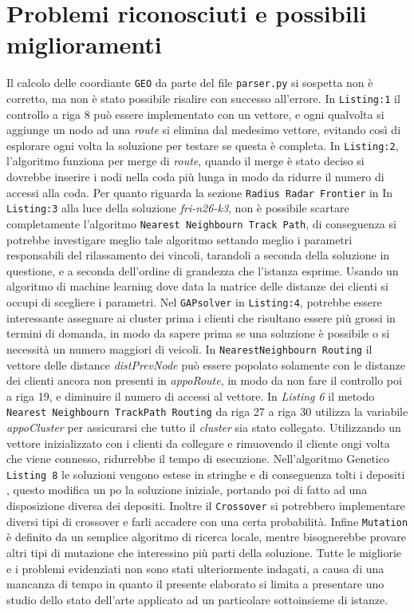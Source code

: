 \documentclass[]{article}
\begin{document}
\section{Problemi riconosciuti e possibili miglioramenti}
Il calcolo delle coordiante \texttt{GEO} da parte del file \texttt{parser.py} si sospetta non è corretto, ma non è stato possibile risalire con successo all'errore.
In \texttt{Listing:1} il controllo a riga 8 può essere implementato con un vettore, e ogni qualvolta si aggiunge un nodo ad una \emph{route} si elimina dal medesimo vettore, evitando così di esplorare ogni volta la soluzione per testare se questa è completa.
In \texttt{Listing:2}, l'algoritmo funziona per merge di \emph{route}, quando il merge è stato deciso si dovrebbe inserire i nodi nella coda più lunga in modo da ridurre il numero di accessi alla coda.
Per quanto riguarda la sezione \texttt{Radius Radar Frontier} in In \texttt{Listing:3} alla luce della soluzione \textit{fri-n26-k3}, non è possibile scartare completamente l'algoritmo \texttt{Nearest Neighbourn Track Path}, di conseguenza si potrebbe investigare meglio tale algoritmo settando meglio i parametri responsabili del rilassamento dei vincoli, tarandoli a seconda della soluzione in questione, e a seconda dell'ordine di grandezza che l'istanza esprime. Usando un algoritmo di machine learning dove data la matrice delle distanze dei clienti si occupi di scegliere i parametri.
Nel \texttt{GAPsolver} in \texttt{Listing:4}, potrebbe essere interessante assegnare ai cluster prima i clienti che risultano essere più grossi in termini di domanda, in modo da sapere prima se una soluzione è possibile o si necessità un numero maggiori di veicoli.
In \texttt{NearestNeighbourn Routing} il vettore delle distance \textit{distPrevNode} può essere popolato solamente con le distanze dei clienti ancora non presenti in \textit{appoRoute}, in modo da non fare il controllo poi a riga 19, e diminuire il numero di accessi al vettore.
In \textit{Listing 6} il metodo \texttt{ Nearest Neighbourn TrackPath Routing} da riga 27 a riga 30 utilizza la variabile \textit{appoCluster} per assicurarsi che tutto il \textit{cluster} sia stato collegato. Utilizzando un  vettore inizializzato con i clienti da collegare e rimuovendo il cliente ongi volta che viene connesso, ridurrebbe il tempo di esecuzione.
Nell'algoritmo Genetico \texttt{Listing 8} le soluzioni vengono estese in stringhe e di conseguenza tolti i depositi , questo modifica un po la soluzione iniziale, portando poi di fatto ad una disposizione diversa dei depositi.   Inoltre il \texttt{Crossover} si potrebbero implementare diversi tipi di crossover e farli accadere con una certa probabilità. Infine \texttt{Mutation} è definito da un semplice algoritmo di ricerca locale, mentre bisognerebbe provare altri tipi di mutazione che interessino più parti della soluzione.
Tutte le migliorie e i problemi evidenziati non sono stati ulteriormente indagati, a causa di una mancanza di tempo in quanto il presente elaborato si limita a presentare uno studio dello stato dell'arte applicato ad un particolare sottoinsieme di istanze.
 


\end{document}

